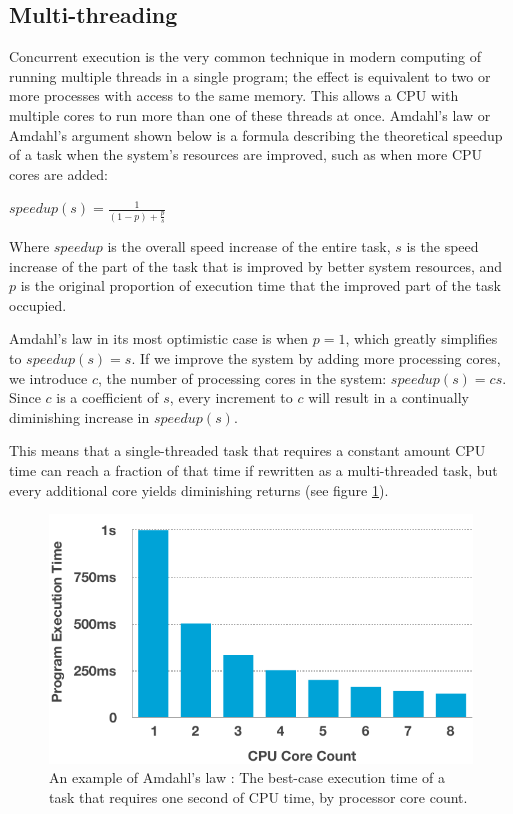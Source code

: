\documentclass[11pt, a4paper, twocolumn]{article}
\begin{document}
\subsection{Multi-threading}

Concurrent execution is the very common technique in modern computing of running multiple threads in a single program; the effect is equivalent to two or more processes with access to the same memory. This allows a CPU with multiple cores to run more than one of these threads at once. Amdahl's law or Amdahl's argument \citep{Rodgers1985} shown below is a formula describing the theoretical speedup of a task when the system's resources are improved, such as when more CPU cores are added:

\begin{center}
\begin{Large}
$speedup(s) = \frac{1}{(1-p)+\frac{p}{s}}$
\end{Large}
\end{center}

Where $speedup$ is the overall speed increase of the entire task, $s$ is the speed increase of the part of the task that is improved by better system resources, and $p$ is the original proportion of execution time that the improved part of the task occupied.

Amdahl's law in its most optimistic case is when $p = 1$, which greatly simplifies to $speedup(s) = s$. If we improve the system by adding more processing cores, we introduce $c$, the number of processing cores in the system: $speedup(s) = cs$. Since $c$ is a coefficient of $s$, every increment to $c$ will result in a continually diminishing increase in $speedup(s)$.

This means that a single-threaded task that requires a constant amount CPU time can reach a fraction of that time if rewritten as a multi-threaded task, but every additional core yields diminishing returns (see figure \ref{fig:cpu_cores}).

\begin{figure}[h]
\includegraphics[width=\linewidth]{cpu_cores}
\caption{An example of Amdahl's law \citep{Rodgers1985}: The best-case execution time of a task that requires one second of CPU time, by processor core count.}
\label{fig:cpu_cores}
\end{figure}
\end{document}
